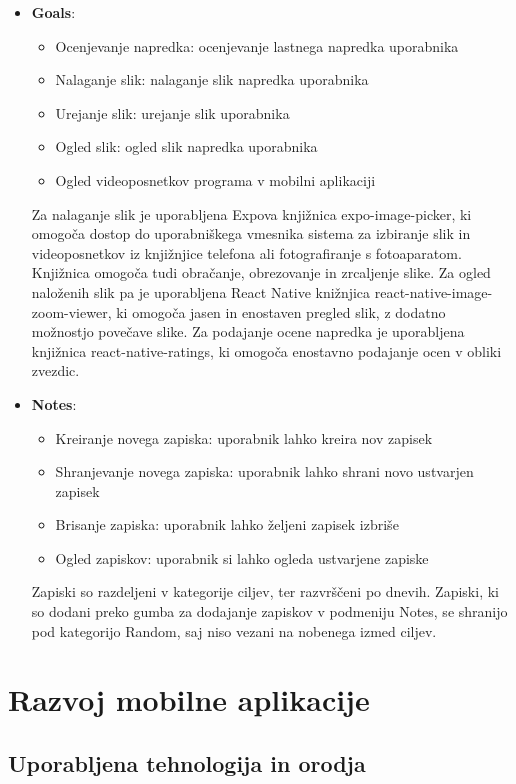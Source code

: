 \documentclass[a4paper, 12pt]{book}
\begin{document}
\begin{itemize}
\item \textbf{Goals}:
  \begin{itemize}
  \item Ocenjevanje napredka: ocenjevanje lastnega napredka uporabnika
  \item Nalaganje slik: nalaganje slik napredka uporabnika
  \item Urejanje slik: urejanje slik uporabnika
  \item Ogled slik: ogled slik napredka uporabnika 
  \item Ogled videoposnetkov programa v mobilni aplikaciji
\end{itemize}
Za nalaganje slik je uporabljena Expova knjižnica expo-image-picker, ki omogoča dostop do uporabniškega vmesnika sistema za izbiranje slik in videoposnetkov iz knjižnjice telefona ali fotografiranje s fotoaparatom. Knjižnica omogoča tudi obračanje, obrezovanje in zrcaljenje slike. 
Za ogled naloženih slik pa je uporabljena React Native knižnjica react-native-image-zoom-viewer, ki omogoča jasen in enostaven pregled slik, z dodatno možnostjo povečave slike.
Za podajanje ocene napredka je uporabljena knjižnica react-native-ratings, ki omogoča enostavno podajanje ocen v obliki zvezdic.
   
\item \textbf{Notes}:
  \begin{itemize}
  \item Kreiranje novega zapiska: uporabnik lahko kreira nov zapisek
  \item Shranjevanje novega zapiska: uporabnik lahko shrani novo ustvarjen zapisek
  \item Brisanje zapiska: uporabnik lahko željeni zapisek izbriše
  \item Ogled zapiskov: uporabnik si lahko ogleda ustvarjene zapiske
\end{itemize}
Zapiski so razdeljeni v kategorije ciljev, ter razvrščeni po dnevih. Zapiski, ki so dodani preko gumba za dodajanje zapiskov v podmeniju Notes, se shranijo pod kategorijo Random, saj niso vezani na nobenega izmed ciljev.

\end{itemize}

\chapter{Razvoj mobilne aplikacije}
\section{Uporabljena tehnologija in orodja}
\end{document}

